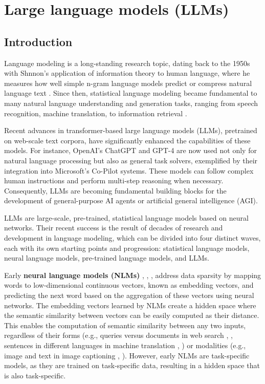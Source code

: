 \section{Large language models (LLMs)}

\subsection{Introduction}

Language modeling is a long-standing research topic, dating back to the 1950s with Shnnon's application of information theory to human language, where he measures how well simple n-gram language models predict or compress natural language text \cite{6773263}. Since then, statistical language modeling became fundamental to many natural language understanding and generation tasks, ranging from speech recognition, machine translation, to information retrieval \cite{Jelinek1997StatisticalMF} \cite{Manning_Raghavan_Schütze_2008}.

Recent advances in transformer-based large language models (LLMs), pretrained on web-scale text corpora, have significantly enhanced the capabilities of these models. For instance, OpenAI's ChatGPT and GPT-4 are now used not only for natural language processing but also as general task solvers, exemplified by their integration into Microsoft's Co-Pilot systems. These models can follow complex human instructions and perform multi-step reasoning when necessary. Consequently, LLMs are becoming fundamental building blocks for the development of general-purpose AI agents or artificial general intelligence (AGI).

LLMs are large-scale, pre-trained, statistical language models based on neural networks. Their recent success is the result of decades of research and development in language modeling, which can be divided into four distinct waves, each with its own starting points and progression: statistical language models, neural language models, pre-trained language models, and LLMs.

Early \textbf{neural language models (NLMs)} \cite{NIPS2000_728f206c}, \cite{schwenk-etal-2006-continuous}, \cite{mikolov10_interspeech}, \cite{graves2014generating} address data sparsity by mapping words to low-dimensional continuous vectors, known as embedding vectors, and predicting the next word based on the aggregation of these vectors using neural networks. The embedding vectors learned by NLMs create a hidden space where the semantic similarity between vectors can be easily computed as their distance. This enables the computation of semantic similarity between any two inputs, regardless of their forms (e.g., queries versus documents in web search \cite{10.1145/2505515.2505665}, \cite{gao2022neural}, sentences in different languages in machine translation \cite{sutskever2014sequence}, \cite{cho2014properties}) or modalities (e.g., image and text in image captioning \cite{cho2014properties}, \cite{vinyals2015tell}). However, early NLMs are task-specific models, as they are trained on task-specific data, resulting in a hidden space that is also task-specific.

